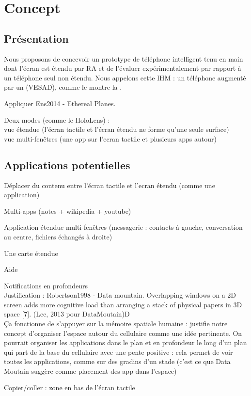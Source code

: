 \chapter{Concept}
\label{ch:concept}

\section{Présentation}

Nous proposons de concevoir un prototype de téléphone intelligent tenu en main dont l'écran est étendu par RA et de l'évaluer expérimentalement par rapport à un téléphone seul non étendu. Nous appelons cette IHM : un téléphone augmenté par un  (VESAD), comme le montre la .


Appliquer Ens2014 - Ethereal Planes.

Deux modes (comme le HoloLens) :\\
vue étendue (l'écran tactile et l'écran étendu ne forme qu'une seule surface)\\
vue multi-fenêtres (une app sur l'ecran tactile et plusieurs apps autour)

\section{Applications potentielles}
Déplacer du contenu entre l'écran tactile et l'ecran étendu (comme une application)

Multi-apps (notes + wikipedia + youtube)

Application étendue multi-fenêtres (messagerie : contacts à gauche, conversation au centre, fichiers échangés à droite)


Une carte étendue


Aide


Notifications en profondeurs\\
Justification : Robertson1998 - Data mountain.  Overlapping windows on a 2D screen adds more cognitive load than arranging a stack of physical papers in  3D space [7]. (Lee, 2013 pour DataMoutain)D\\
Ça fonctionne de s'appuyer sur la mémoire spatiale humaine : justifie notre concept d'organiser l'espace autour du cellulaire comme une idée pertinente. On pourrait organiser les applications dans le plan et en profondeur le long d'un plan qui part de la base du cellulaire avec une pente positive : cela permet de voir toutes les applications, comme sur des gradins d'un stade (c'est ce que Data Moutain suggère comme placement des app dans l'espace)

Copier/coller : zone en bas de l'écran tactile